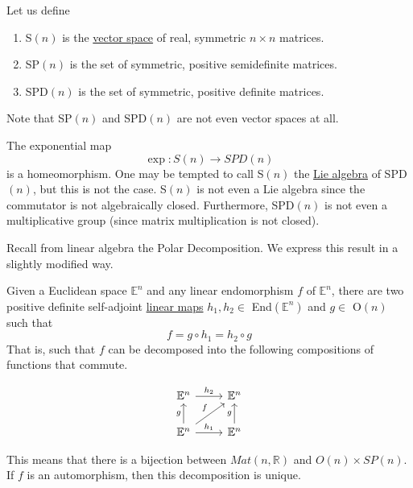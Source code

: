 \documentclass{article}
\newcounter{theorem}[section]
\newcounter{definition}[section]
\begin{document}
    \begin{definition}
      \label{def:symmetric-and-positive-definite-matrix-spaces}
      Let us define 
      \begin{enumerate}
        \item S$(n)$ is the \hyperref[lin-def:vector-space]{vector space} of real, symmetric $n \times n$ matrices. 
        \item SP$(n)$ is the set of symmetric, positive semidefinite matrices. 
        \item SPD$(n)$ is the set of symmetric, positive definite matrices. 
      \end{enumerate}
      Note that SP$(n)$ and SPD$(n)$ are not even vector spaces at all. 
    \end{definition}

    \begin{lemma}
      \label{thm:expsntospdn-is-a-homeomorphism}
      The exponential map 
      \begin{equation}
        \exp: S(n) \rightarrow SPD(n)
      \end{equation}
      is a homeomorphism. One may be tempted to call S$(n)$ the \hyperref[def:lie-algebra]{Lie algebra} of SPD$(n)$, but this is not the case. S$(n)$ is not even a Lie algebra since the commutator is not algebraically closed. Furthermore, SPD$(n)$ is not even a multiplicative group (since matrix multiplication is not closed). 
    \end{lemma}

    Recall from linear algebra the Polar Decomposition. We express this result in a slightly modified way. 

    \begin{theorem}
      \label{thm:polar-decomposition}
      Given a Euclidean space $\mathbb{E}^n$ and any linear endomorphism $f$ of $\mathbb{E}^n$, there are two positive definite self-adjoint \hyperref[lin-def:linear_map]{linear maps} $h_1, h_2 \in$ End$(\mathbb{E}^n)$ and $g \in$ O$(n)$ such that
      \begin{equation}
        f = g \circ h_1 = h_2 \circ g
      \end{equation}
      That is, such that $f$ can be decomposed into the following compositions of functions that commute. 

      \begin{equation}
        \begin{tikzcd}
            \mathbb{E}^n \arrow{r}{h_2} & \mathbb{E}^n \\
            \mathbb{E}^n \arrow{u}{g} \arrow{ur}{f} \arrow{r}{h_1} & \mathbb{E}^n \arrow{u}{g}
            \end{tikzcd}
      \end{equation}

      This means that there is a bijection between $Mat(n, \mathbb{R})$ and $O(n) \times SP(n)$. If $f$ is an automorphism, then this decomposition is unique. 
    \end{theorem}
\end{document}
